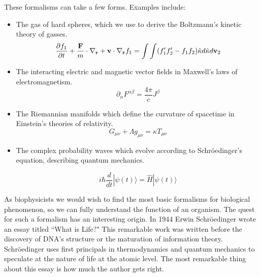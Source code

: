 These formalisms can take a few forms. Examples include:
\begin{itemize}
\item The gas of hard spheres, which we use to derive the Boltzmann's kinetic theory of gasses.  
\begin{equation}
	\label{hard_spheres}
	\frac{\partial f_1}{\partial t} + \frac{\bold{F}}{m}\cdot\nabla_\bold{r} + \bold{v} \cdot \nabla_\bold{r} f_1 =  \int \int (f'_1f'_2 - f_1 f_2) \tilde \kappa d \hat \kappa d \bold{v}_2
\end{equation}

\item The interacting electric and magnetic vector fields in Maxwell's laws of electromagnetism.
\begin{equation}
	\partial_\alpha F^{\alpha \beta} = \frac{4\pi}{c} J^\beta
\end{equation}

\item The Riemannian manifolds which define the curvature of spacetime in Einstein's theories of relativity.
\begin{equation}
	G_{\mu \nu} + \Lambda g_{\mu \nu} = \kappa T_{\mu \nu}
\end{equation}

\item The complex probability waves which evolve according to Schr\"oedinger's equation, describing quantum mechanics. 

\begin{equation}
	i \hbar \frac{d}{dt} | \psi (t) \rangle = \hat {H} | \psi (t) \rangle 
\end{equation}
\end{itemize}

As biophysicists we would wish to find the most basic formalisms for biological phenomenon, so we can fully understand the function of an organism. The quest for such a formalism has an interesting origin. In 1944 Erwin Schr\"oedinger wrote an essay titled ``What is Life?" This remarkable work was written before the discovery of DNA's structure or the maturation of information theory. Schr\"oedinger uses first principals in thermodynamics and quantum mechanics to speculate at the nature of life at the atomic level. The most remarkable thing about this essay is how much the author gets right. 

